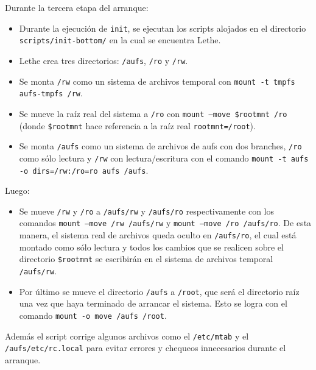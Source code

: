 \documentclass[final,narroweqnarray,inline,twoside]{ieee}
\begin{document}
Durante la tercera etapa del arranque: 
\begin{itemize}
 \item Durante la ejecución de \texttt{init}, se ejecutan los scripts alojados en el directorio \texttt{scripts/init-bottom/} en la cual se encuentra Lethe. 
 \item Lethe crea tres directorios: \texttt{/aufs}, \texttt{/ro} y \texttt{/rw}.
 \item Se monta \texttt{/rw} como un sistema de archivos temporal con \texttt{mount -t tmpfs aufs-tmpfs /rw}.
 \item Se mueve la raíz real del sistema a \texttt{/ro} con  \texttt{mount --move \${rootmnt} /ro} (donde \texttt{\${rootmnt}} hace referencia a la raíz real \texttt{rootmnt=/root}).
 \item Se monta \texttt{/aufs} como un sistema de archivos de aufs con dos branches, \texttt{/ro} como sólo lectura y \texttt{/rw} con lectura/escritura con el comando \texttt{mount -t aufs -o dirs=/rw:/ro=ro aufs /aufs}. 
\end{itemize}
Luego:
\begin{itemize}
 \item Se mueve \texttt{/rw} y \texttt{/ro} a \texttt{/aufs/rw} y \texttt{/aufs/ro} respectivamente con los comandos \texttt{mount --move /rw /aufs/rw} y \texttt{mount --move /ro /aufs/ro}. De esta manera, el sistema real de archivos queda oculto en \texttt{/aufs/ro}, el cual está montado como sólo lectura y todos los cambios que se realicen sobre el directorio \texttt{\${rootmnt}} se escribirán en el sistema de archivos temporal \texttt{/aufs/rw}.
 \item Por último se mueve el directorio \texttt{/aufs} a \texttt{/root}, que será el directorio raíz una vez que haya terminado de arrancar el sistema. Esto se logra con el comando \texttt{mount -o move /aufs /root}.
\end{itemize}
Además el script corrige algunos archivos como el \texttt{/etc/mtab} y el \texttt{/aufs/etc/rc.local} para evitar errores y chequeos innecesarios durante el arranque.
\end{document}
